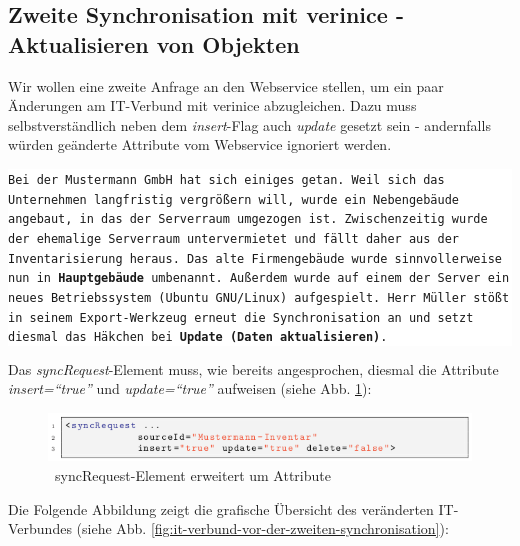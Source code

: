 \documentclass[a4paper,10pt]{book}
\begin{document}
\subsection{ Zweite Synchronisation mit verinice - Aktualisieren von Objekten}
Wir wollen eine zweite Anfrage an den Webservice stellen, um ein paar Änderungen am IT-Verbund mit verinice abzugleichen. Dazu
muss selbstverständlich neben dem \textit{insert}-Flag auch \textit{update} gesetzt sein - andernfalls würden geänderte Attribute
vom Webservice ignoriert werden.
\newline
\newline
\colorbox{white}{\parbox{\textwidth}{
{\tt Bei der Mustermann GmbH hat sich einiges getan. Weil sich das Unternehmen langfristig vergrößern will, wurde ein Nebengebäude angebaut,
in das der Serverraum umgezogen ist. Zwischenzeitig wurde der ehemalige Serverraum untervermietet und fällt daher aus der Inventarisierung heraus.
Das alte Firmengebäude wurde sinnvollerweise nun in \textbf{Hauptgebäude} umbenannt. Außerdem wurde auf einem der Server ein neues Betriebssystem
(Ubuntu GNU/Linux) aufgespielt. Herr Müller stößt in seinem Export-Werkzeug erneut die Synchronisation an und setzt diesmal das Häkchen bei
\textbf{Update (Daten aktualisieren)}.}
}}\newline\newline
Das \textit{syncRequest}-Element muss, wie bereits angesprochen, diesmal die Attribute \textit{insert=``true''} und
\textit{update=``true''} aufweisen (siehe Abb. \ref{syncRequest-Element erweitert um Attribute}):
\newline
\begin{figure}[htb!]
  \centering
  \includegraphics[scale=.75]{Screenshot/SyncAPI_Fallstudie_09.png}
  \caption{\label{syncRequest-Element erweitert um Attribute} \ syncRequest-Element erweitert um Attribute}
\end{figure}
\newline
Die Folgende Abbildung zeigt die grafische Übersicht des veränderten
IT-Verbundes (siehe
Abb. \ref{fig:it-verbund-vor-der-zweiten-synchronisation}):
\newline
\end{document}
